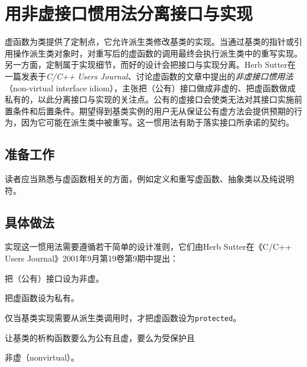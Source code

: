 
\section{用非虚接口惯用法分离接口与实现}



虚函数为类提供了定制点，它允许派生类修改基类的实现。当通过基类的指针或引用操作派生类对象时，对重写后的虚函数的调用最终会执行派生类中的重写实现。另一方面，定制属于实现细节，而好的设计会把接口与实现分离。Herb Sutter在一篇发表于\textit{C/C++} \textit{Users Journal}、讨论虚函数的文章中提出的\textit{非虚接口惯用法}（non-virtual interface idiom），主张把（公有）接口做成非虚的、把虚函数做成私有的，以此分离接口与实现的关注点。公有的虚接口会使类无法对其接口实施前置条件和后置条件。期望得到基类实例的用户无从保证公有虚方法会提供预期的行为，因为它可能在派生类中被重写。这一惯用法有助于落实接口所承诺的契约。



\subsection{准备工作}



读者应当熟悉与虚函数相关的方面，例如定义和重写虚函数、抽象类以及纯说明符。



\subsection{具体做法}



实现这一惯用法需要遵循若干简单的设计准则，它们由Herb Sutter在《C/C++ Users Journal》2001年9月第19卷第9期中提出：



把（公有）接口设为非虚。



把虚函数设为私有。



仅当基类实现需要从派生类调用时，才把虚函数设为\texttt{protected}。



让基类的析构函数要么为公有且虚，要么为受保护且



非虚（nonvirtual）。



